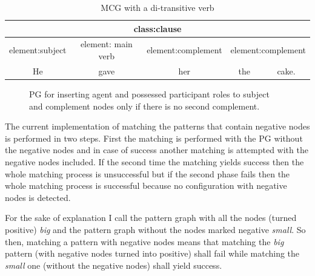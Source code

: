 \begin{table}[ht]
\centering
\begin{tabular}{|c|c|c|c|c|}
\hline
\multicolumn{5}{|c|}{class:clause}                                                                  \\ \hline
element:subject & element: main verb & element:complement & \multicolumn{2}{c|}{element:complement} \\ \hline
He              & gave               & her                & the               & cake.               \\ \hline
\end{tabular}
\caption{MCG with a di-transitive verb}
\label{tab:di-transitive1}
\end{table}

\begin{figure}[hbtp]
\centering
{}
\caption{PG for inserting agent and possessed participant roles to subject and complement nodes only if there is no second complement.}
\label{fig:gp4}
\end{figure}

The current implementation of matching the patterns that contain negative nodes is performed in two steps. First the matching is performed with the PG without the negative nodes and in case of success another matching is attempted with the negative nodes included. If the second time the matching yields success then the whole matching process is unsuccessful but if the second phase fails then the whole matching process is successful because no configuration with negative nodes is detected.

For the sake of explanation I call the pattern graph with all the nodes (turned positive) \textit{big} and the pattern graph without the nodes marked negative \textit{small}. So then, matching a pattern with negative nodes means that matching the \textit{big} pattern (with negative nodes turned into positive) shall fail while matching the \textit{small} one (without the negative nodes) shall yield success.

